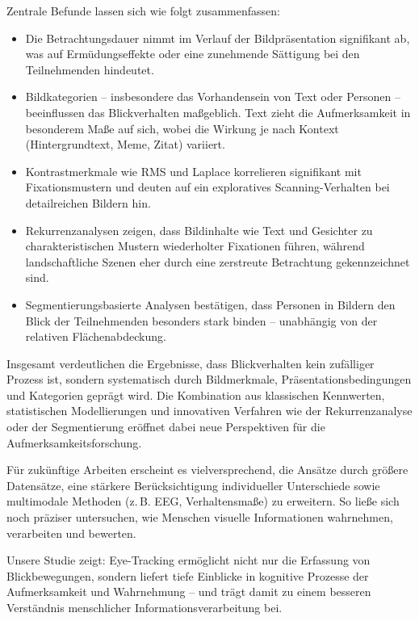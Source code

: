 \documentclass[
    language=german, %
    thesis=seminar, %
    supervisor=postdoc, %
    multiauthor=true, %
    ]{settings/csssa-thesis}
\begin{document}
Zentrale Befunde lassen sich wie folgt zusammenfassen: 
\begin{itemize}
    \item Die Betrachtungsdauer nimmt im Verlauf der Bildpräsentation signifikant ab, 
    was auf Ermüdungseffekte oder eine zunehmende Sättigung bei den Teilnehmenden hindeutet. 
    \item Bildkategorien – insbesondere das Vorhandensein von Text oder Personen – 
    beeinflussen das Blickverhalten maßgeblich. Text zieht die Aufmerksamkeit in besonderem Maße auf sich, 
    wobei die Wirkung je nach Kontext (Hintergrundtext, Meme, Zitat) variiert. 
    \item Kontrastmerkmale wie RMS und Laplace korrelieren signifikant mit Fixationsmustern 
    und deuten auf ein exploratives Scanning-Verhalten bei detailreichen Bildern hin. 
    \item Rekurrenzanalysen zeigen, dass Bildinhalte wie Text und Gesichter zu charakteristischen 
    Mustern wiederholter Fixationen führen, während landschaftliche Szenen eher durch eine zerstreute 
    Betrachtung gekennzeichnet sind. 
    \item Segmentierungsbasierte Analysen bestätigen, dass Personen in Bildern 
    den Blick der Teilnehmenden besonders stark binden – unabhängig von der relativen Flächenabdeckung. 
\end{itemize}
\hfill
\newline Insgesamt verdeutlichen die Ergebnisse, dass Blickverhalten kein zufälliger Prozess ist, 
sondern systematisch durch Bildmerkmale, Präsentationsbedingungen und Kategorien geprägt wird. 
Die Kombination aus klassischen Kennwerten, statistischen Modellierungen und innovativen Verfahren 
wie der Rekurrenzanalyse oder der Segmentierung eröffnet dabei neue Perspektiven für die 
Aufmerksamkeitsforschung. 

Für zukünftige Arbeiten erscheint es vielversprechend, die Ansätze durch größere Datensätze, 
eine stärkere Berücksichtigung individueller Unterschiede sowie multimodale Methoden (z.\,B. EEG, 
Verhaltensmaße) zu erweitern. So ließe sich noch präziser untersuchen, wie Menschen visuelle 
Informationen wahrnehmen, verarbeiten und bewerten.  

Unsere Studie zeigt: Eye-Tracking ermöglicht nicht nur die Erfassung von Blickbewegungen, 
sondern liefert tiefe Einblicke in kognitive Prozesse der Aufmerksamkeit und Wahrnehmung – 
und trägt damit zu einem besseren Verständnis menschlicher Informationsverarbeitung bei. 
\end{document}
